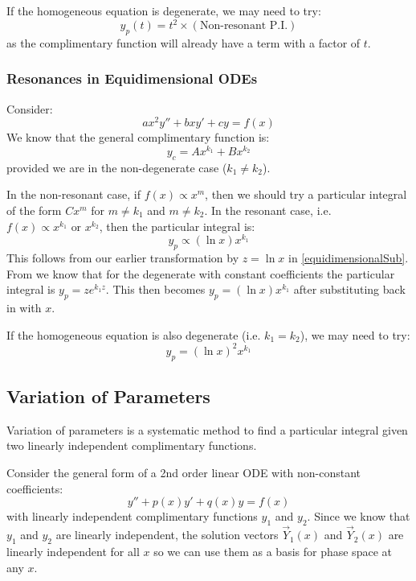 \documentclass[../main.tex]{subfiles}
\begin{document}
\begin{remark}[Note]
  If the homogeneous equation is degenerate, we may need to try:
  \[
    y_p(t) = t^2 \times (\text{Non-resonant P.I.})
  \]
  as the complimentary function will already have a term with a factor of $t$.
\end{remark}
\subsubsection{Resonances in Equidimensional ODEs}
Consider:
\[
  ax^2y'' + bxy' + cy = f(x)
\]
We know that the general complimentary function is:
\[
  y_c = Ax^{k_1} + Bx^{k_2}
\]
provided we are in the non-degenerate case ($k_1 \neq k_2$).

In the non-resonant case, if $f(x) \propto x^{m}$, then we should try a particular integral of the form $Cx^{m}$ for $m \neq k_1$ and $m \neq k_2$.
In the resonant case, i.e. $f(x) \propto x^{k_1} \text{ or }x^{k_2}$, then the particular integral is:
\[
  y_p \propto (\ln x) x^{k_1}
\]
This follows from our earlier transformation by $z = \ln x$ in \cref{equidimensionalSub}.
From we know that for the degenerate with constant coefficients the particular integral is $y_p = ze^{k_1 z}$.
This then becomes $y_p = (\ln x)x^{k_1}$ after substituting back in with $x$.
\begin{remark}[Note]
  If the homogeneous equation is also degenerate (i.e. $k_1 = k_2$), we may need to try:
  \[
    y_p = (\ln x)^2 x^{k_1}
  \]
\end{remark}
\subsection{Variation of Parameters}
Variation of parameters is a systematic method to find a particular integral given two linearly independent complimentary functions.

Consider the general form of a 2nd order linear ODE with non-constant coefficients:
\[
  y'' + p(x)y' + q(x)y = f(x)
\]
with linearly independent complimentary functions $y_1$ and $y_2$.
Since we know that $y_1$ and $y_2$ are linearly independent, the solution vectors $\vec{Y}_1(x)$ and $\vec{Y}_2(x)$ are linearly independent for all $x$ so we can use them as a basis for phase space at any $x$.
\end{document}
